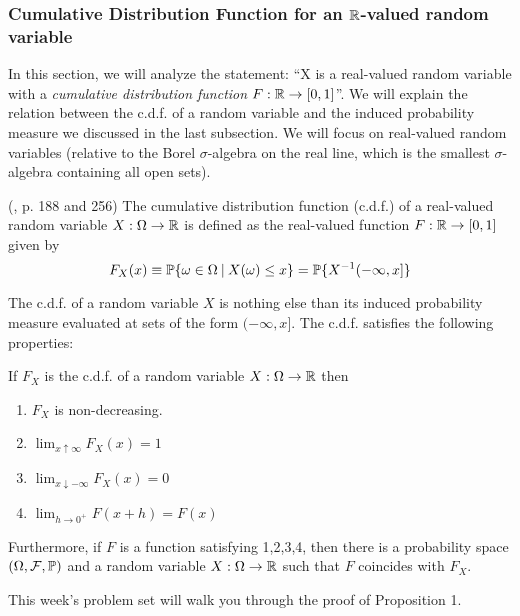 \documentclass[11pt]{article} %
\begin{document}
\subsubsection{Cumulative Distribution Function for an $\mathbb{R}$-valued random variable}

In this section, we will analyze the statement: ``X is a real-valued random variable with a \emph{cumulative distribution function} $F:\mathbb{R} \rightarrow [0,1]$''. We will explain the relation between the c.d.f. of a random variable and the induced probability measure we discussed in the last subsection. We will focus on real-valued random variables (relative to the Borel $\sigma$-algebra on the real line, which is the smallest $\sigma$-algebra containing all open sets). 

\begin{definition} (\cite{Billingsley95}, p. 188 and 256)
The cumulative distribution function (c.d.f.) of a real-valued random variable $X: \Omega \rightarrow \mathbb{R}$ is defined as the real-valued function $F:\mathbb{R}\rightarrow[0,1]$ given by
$$F_{X}(x) \equiv \mathbb{P}\{ \omega \in \Omega \: | \: X(\omega) \leq x\} = \mathbb{P}\{X^{-1}(-\infty,x]\}    $$
\end{definition}

The c.d.f. of a random variable $X$ is nothing else than its induced probability measure evaluated at sets of the form $(-\infty, x]$. The c.d.f. satisfies the following properties:

\begin{proposition} If $F_{X}$ is the c.d.f. of a random variable $X: \Omega \rightarrow \mathbb{R}$ then 
\begin{enumerate}
\item $F_{X}$ is non-decreasing.
\item $\lim_{x \uparrow \infty} F_{X}(x)=1$
\item $\lim_{x \downarrow -\infty} F_{X}(x)=0$
\item $\lim_{h \rightarrow 0^{+}} F(x+h)=F(x)$
\end{enumerate}

\noindent Furthermore, if $F$ is a function satisfying 1,2,3,4, then there is a probability space $(\Omega, \mathcal{F}, \mathbb{P})$ and a random variable $X: \Omega \rightarrow \mathbb{R}$ such that $F$ coincides with $F_{X}$. 

\end{proposition}

\noindent \begin{prproblem}
   This week's problem set will walk you through the proof of Proposition 1.\\ 
\end{prproblem}
\end{document}
